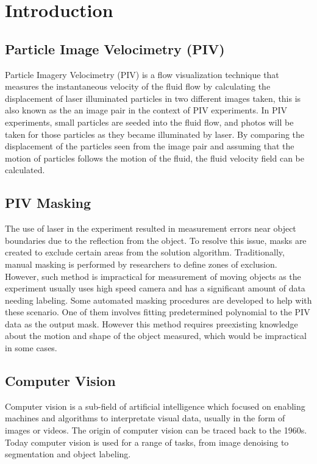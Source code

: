 \documentclass[12pt]{report}
\begin{document}
\newpage

\listoffigures
\newpage

\listoftables
\newpage


\chapter{Introduction}
\section{Particle Image Velocimetry (PIV)}
Particle Imagery Velocimetry (PIV) is a flow visualization technique that measures the instantaneous 
velocity of the fluid flow by calculating the displacement of laser illuminated particles in two different 
images taken, this is also known as the an image pair in the context of PIV experiments. 
In PIV experiments, small particles are seeded into the fluid flow, and photos will be taken for those
particles as they became illuminated by laser. By comparing the displacement of the particles seen from the image
pair and assuming that the motion of particles follows the motion of the fluid, the fluid velocity field can be calculated.
\section{PIV Masking}
The use of laser in the experiment resulted in measurement errors near object boundaries 
due to the reflection from the object. To resolve this issue, masks are created to exclude certain 
areas from the solution algorithm. Traditionally, manual masking is performed by researchers to define zones of 
exclusion. However, such method is impractical for measurement of moving objects as the experiment 
usually uses high speed camera and has a significant amount of data needing labeling. Some automated 
masking procedures are developed to help with these scenario. One of them involves fitting predetermined 
polynomial to the PIV data as the output mask. However this method requires preexisting knowledge about 
the motion and shape of the object measured, which would be impractical in some cases.
\section{Computer Vision}
Computer vision is a sub-field of artificial intelligence which focused on enabling machines and algorithms to 
interpretate visual data, usually in the form of images or videos. The origin of computer vision can be traced back
to the 1960s. Today computer vision is used for a range of tasks, from image denoising to segmentation and object labeling.
\end{document}

